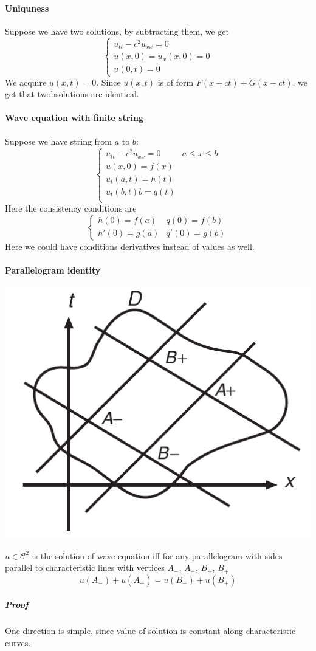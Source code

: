 \paragraph{Uniquness}
Suppose we have two solutions, by subtracting them, we get
$$\begin{cases}
u_{tt} -c^2u_{xx} = 0\\u(x,0) = u_x(x,0) = 0\\ u(0,t) = 0
\end{cases}$$
We acquire $u(x,t)=0$. Since $u(x,t)$ is of form $F(x+ct)+G(x-ct)$, we get that twobsolutions are identical.
\paragraph{Wave equation with finite string}
Suppose we have string from $a$ to $b$:
$$\begin{cases}
u_{tt} - c^2u_{xx} = 0 & a\leq x \leq b \\
u(x,0) = f(x) \\
u_t(a,t) = h(t)\\
u_t(b,t)b= q(t)\\
\end{cases}$$
Here the consistency conditions are
$$\begin{cases}
h(0) = f(a) & q(0) = f(b)\\
h'(0) = g(a) & q'(0) = g(b)
\end{cases}$$
Here we could have conditions derivatives instead of values as well.
\paragraph{Parallelogram identity}

\begin{center}
	\includegraphics[width=0.4\linewidth]{./lect4/pic1.png}
\end{center}
$u\in \mathcal{C}^2$ is the solution of wave equation iff for any parallelogram with sides parallel to characteristic lines with vertices $A_-$, $A_+$, $B_-$, $B_+$ 
$$u(A_-)+u(A_+) = u(B_-) + u(B_+)$$
\subparagraph{Proof}
One direction is simple, since value of solution is constant along characteristic curves.

